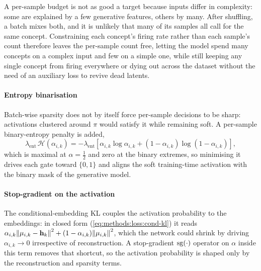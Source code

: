     A per-sample budget is not as good a target because inputs differ in
    complexity: some are explained by a few generative features, others by many.
    After shuffling, a batch mixes both, and it is unlikely that many of its
    samples all call for the same concept. Constraining each concept's firing
    rate rather than each sample's count therefore leaves the per-sample count
    free, letting the model spend many concepts on a complex input and few on a
    simple one, while still keeping any single concept from firing everywhere or
    dying out across the dataset without the need of an auxiliary loss to revive
    dead latents.

    \paragraph{Entropy binarisation} Batch-wise sparsity does not by itself
    force per-sample decisions to be sharp: activations clustered around $\pi$
    would satisfy it while remaining soft. A per-sample binary-entropy penalty
    is added,
    \begin{equation*}
        \lambda_{\mathrm{ent}}\, \mathcal{H}(\alpha_{i,k}) = -\lambda_{\mathrm{ent}}
        \left[\alpha_{i,k} \log \alpha_{i,k} + (1 - \alpha_{i,k}) \log(1 -
        \alpha_{i,k})\right],
    \end{equation*}
    which is maximal at $\alpha = \tfrac{1}{2}$ and zero at the binary extremes,
    so minimising it drives each gate toward $\{0,1\}$ and aligns the soft
    training-time activation with the binary mask of the generative model.

    \paragraph{Stop-gradient on the activation} The
    con\-di\-tion\-al-em\-bed\-ding \ac{KL} couples the activation probability
    to the embeddings: in closed form
    (\cref{eq:methods:loss:cond-kl}) it reads $\alpha_{i,k}
    \norm{\vb{\mu}_{i,k} - \vb{h}_k}^{2} + (1 - \alpha_{i,k})
    \norm{\vb{\mu}_{i,k}}^{2}$, which the network could shrink by driving
    $\alpha_{i,k} \to 0$ irrespective of reconstruction. A stop-gradient
    $\operatorname{sg}(\cdot)$ operator on $\alpha$ inside this term removes that
    shortcut, so the activation probability is shaped only by the reconstruction
    and sparsity terms.

